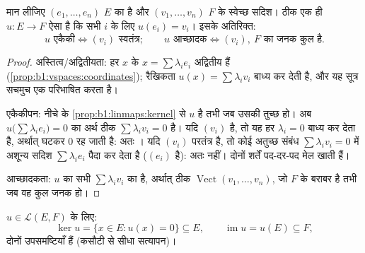 \begin{proposition}[रैखिक प्रतिचित्रण आधार पर जान लिया जाता है]\label{prop:b1:linmaps:basis}
मान लीजिए $(e_1, \dots, e_n)$ $E$ का  है और $(v_1, \dots, v_n)$ $F$ के
स्वेच्छ सदिश। ठीक एक ही  $u \colon E \to F$ ऐसा है कि सभी
$i$ के लिए $u(e_i) = v_i$। इसके अतिरिक्त:
\[
u \text{ एकैकी} \iff (v_i) \text{ स्वतंत्र};
\qquad
u \text{ आच्छादक} \iff (v_i),\ F \text{ का जनक कुल है} .
\]
\end{proposition}

\begin{proof}
अस्तित्व/अद्वितीयता: हर $x$ के  $x = \sum \lambda_i e_i$ अद्वितीय
हैं (\cref{prop:b1:vspaces:coordinates}); रैखिकता $u(x) = \sum \lambda_i
v_i$ बाध्य कर देती है, और यह सूत्र सचमुच एक  परिभाषित करता
है।

एकैकीपन: नीचे के \cref{prop:b1:linmaps:kernel} से $u$  है तभी जब उसकी
 तुच्छ हो। अब $u\bigl(\sum\lambda_i e_i\bigr) = 0$ का अर्थ ठीक
$\sum\lambda_i v_i = 0$ है। यदि $(v_i)$  है, तो यह हर $\lambda_i =
0$ बाध्य कर देता है, अर्थात्  घटकर $0$ रह जाती है: अतः । यदि
$(v_i)$ परतंत्र है, तो कोई अतुच्छ संबंध $\sum\lambda_i v_i = 0$  में
अशून्य सदिश $\sum\lambda_i e_i$ पैदा कर देता है ($(e_i)$  है): अतः
 नहीं। दोनों शर्तें पद-दर-पद मेल खाती हैं।

आच्छादकता: $u$ का  सभी $\sum\lambda_i v_i$ का  है, अर्थात्
ठीक $\operatorname{Vect}(v_1, \dots, v_n)$, जो $F$ के बराबर है तभी जब वह कुल
जनक हो।
\end{proof}

\begin{definition}[अष्टि और प्रतिबिंब]\label{def:b1:linmaps:kerim}
$u \in \mathcal{L}(E, F)$ के लिए:
\[
\ker u = \{x \in E : u(x) = 0\} \subseteq E,
\qquad
\operatorname{im} u = u(E) \subseteq F ,
\]
दोनों उपसमष्टियाँ हैं (कसौटी से सीधा सत्यापन)।
\end{definition}

